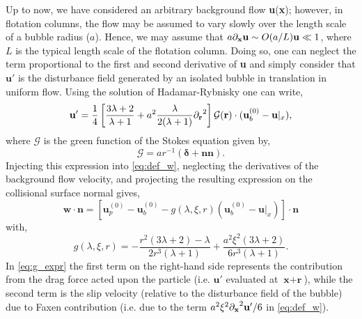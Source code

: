 Up to now, we have considered an arbitrary background flow \textbf{u}(\textbf{x}); however, in flotation columns, the flow may be assumed to vary slowly over the length scale of a bubble radius ($a$). 
Hence, we may assume that $a {\partial_\textbf{x}} \textbf{u} \sim O(a/L) \textbf{u} \ll 1$, where $L$ is the typical length scale of the flotation column. 
Doing so, one can neglect the term proportional to the first and second derivative of \textbf{u} and simply consider that $\textbf{u}'$ is the disturbance field generated by an isolated bubble in translation in uniform flow. 
Using the solution of Hadamar-Rybnisky \citep{pozrikidis1992boundary,kim2013microhydrodynamics} one can write,
\begin{equation}
    \textbf{u}'
    =
    \frac{1}{4}
    \left[  \frac{3\lambda+2}{\lambda +1}
        + a^2 \frac{\lambda }{2(\lambda+1)}{\partial_\textbf{r}}^2
    \right] \mathcal{G}(\textbf{r})\cdot (\textbf{u}_b^{(0)} - \textbf{u}|_x),
\end{equation}
where $\mathcal{G}$ is the green function of the Stokes equation given by, 
\begin{equation}
    \mathcal{G} = a  r^{-1}(\bm\delta+\textbf{nn}).
\end{equation}
Injecting this expression into \eqref{eq:def_w}, neglecting the derivatives of the background flow velocity, and projecting the resulting expression on the collisional surface normal gives,  
\begin{equation}
    \textbf{w}\cdot \textbf{n}
    =
    [\textbf{u}_p^{(0)}  - \textbf{u}_b^{(0)} - g(\lambda,\xi,r) (\textbf{u}_b^{(0)} - \textbf{u}|_x)]\cdot \textbf{n}
    \label{eq:def_w}
\end{equation}
with, 
\begin{equation}
    g(\lambda,\xi,r) = 
    - \frac{r^2 (3\lambda +2) -\lambda }{2r^3(\lambda+1)}
    +
    \frac{a^2\xi^{2}  \left(3 \lambda + 2\right)}{6 r^{3} \left(\lambda + 1\right) }. 
    \label{eq:g_expr}
\end{equation}
In \eqref{eq:g_expr} the first term on the right-hand side represents the contribution from the drag force acted upon the particle (i.e. $\textbf{u}'$ evaluated at $\textbf{x}+\textbf{r}$), while the second term is the slip velocity (relative to the disturbance field of the bubble) due to Faxen contribution (i.e. due to the term $a^2\xi^2 {\partial_\textbf{x}}^2 \textbf{u}'/6$ in \eqref{eq:def_w}). 


